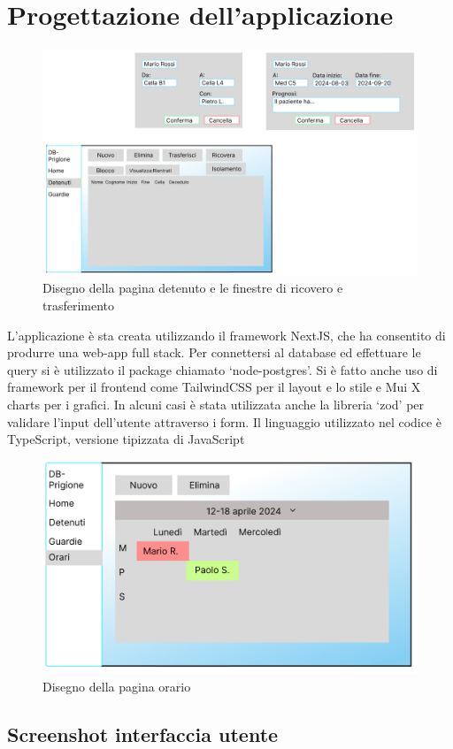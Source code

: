 \documentclass[a4paper,12pt]{report}
\begin{document}
\section{Progettazione dell'applicazione}
\begin{figure}[H]
\caption{Disegno della pagina detenuto e le finestre di ricovero e trasferimento}
\includegraphics[scale=0.6]{progettazione_applicazione.png}
\end{figure}
L'applicazione è sta creata utilizzando il framework NextJS, che ha consentito di produrre una web-app full stack.
%
Per connettersi al database ed effettuare le query si è utilizzato il package chiamato `node-postgres'.
%
Si è fatto anche uso di framework per il frontend come TailwindCSS per il layout e lo stile e Mui X charts per i grafici.
%
In alcuni casi è stata utilizzata anche la libreria `zod' per validare l'input dell'utente attraverso i form.
%
Il linguaggio utilizzato nel codice è TypeScript, versione tipizzata di JavaScript
\\
\begin{figure}[H]
\includegraphics[scale=0.5]{progettazione_orari.png}
\caption{Disegno della pagina orario}  
\end{figure}

\subsection{Screenshot interfaccia utente}
\end{document}
